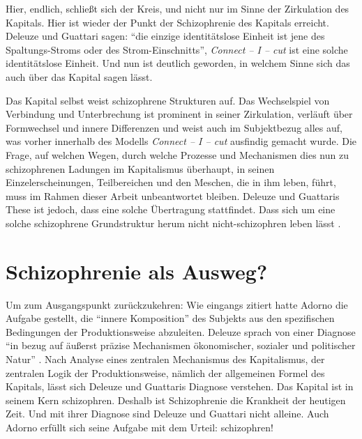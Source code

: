 \documentclass[12pt,
               paper=a4,
               twoside=false,
               onehalfspacing,
               bibliography=totoc,
               toc=graduated,
               ]{scrartcl}
\newcommand{\pc}[2]{\parencite[#1]{#2}}
\newcommand{\vgl}[2]{\parencite[vgl.][#1]{#2}}
\newcommand{\worries}[1]{\ifdraft{\textcolor{blue}{\texttt{(#1)}}}{}}
\newcommand{\cic}{Connect -- I -- cut\xspace}
\newcommand{\dg}{Deleuze und Guattari\xspace}
\begin{document}
Hier, endlich, schließt sich der Kreis, und nicht nur im Sinne der
Zirkulation des Kapitals. Hier ist wieder der Punkt der Schizophrenie
des Kapitals erreicht. \dg sagen: "`die einzige identitätslose Einheit
ist jene des Spaltungs-Stroms oder des Strom-Einschnitts"',
\emph{\cic} ist eine solche identitätslose Einheit. Und nun ist
deutlich geworden, in welchem Sinne sich das auch über das Kapital
sagen lässt.

Das Kapital selbst weist schizophrene Strukturen auf. Das Wechselspiel
von Verbindung und Unterbrechung ist prominent in seiner Zirkulation,
verläuft über Formwechsel und innere Differenzen und weist auch im
Subjektbezug alles auf, was vorher innerhalb des Modells \emph{\cic}
ausfindig gemacht wurde. Die Frage, auf welchen Wegen, durch welche
Prozesse und Mechanismen dies nun zu schizophrenen Ladungen im
Kapitalismus überhaupt, in seinen Einzelerscheinungen, Teilbereichen
und den Meschen, die in ihm leben, führt, muss im Rahmen dieser Arbeit
unbeantwortet bleiben. Deleuze und Guattaris These ist jedoch, dass
eine solche Übertragung stattfindet. Dass sich um eine solche
schizophrene Grundstruktur herum nicht nicht-schizophren leben lässt
\vgl{S. 315 f.}{ao}.



%



\section{Schizophrenie als Ausweg?}

Um zum Ausgangspunkt zurückzukehren: Wie eingangs zitiert hatte Adorno
die Aufgabe gestellt, die "`innere Komposition"' \pc{261}{min} des
Subjekts aus den spezifischen Bedingungen der Produktionsweise
abzuleiten. Deleuze sprach von einer Diagnose "`in bezug auf äußerst
präzise Mechanismen ökonomischer, sozialer und politischer Natur"'
\pc{28}{schizg}. Nach Analyse eines zentralen Mechanismus des
Kapitalismus, der zentralen Logik der Produktionsweise, nämlich der
allgemeinen Formel des Kapitals, lässt sich Deleuze und Guattaris
Diagnose verstehen. Das Kapital ist in seinem Kern schizophren.
Deshalb ist Schizophrenie die Krankheit der heutigen Zeit. Und mit
ihrer Diagnose sind \dg nicht alleine. Auch Adorno erfüllt sich seine
Aufgabe mit dem Urteil: schizophren!
\end{document}
